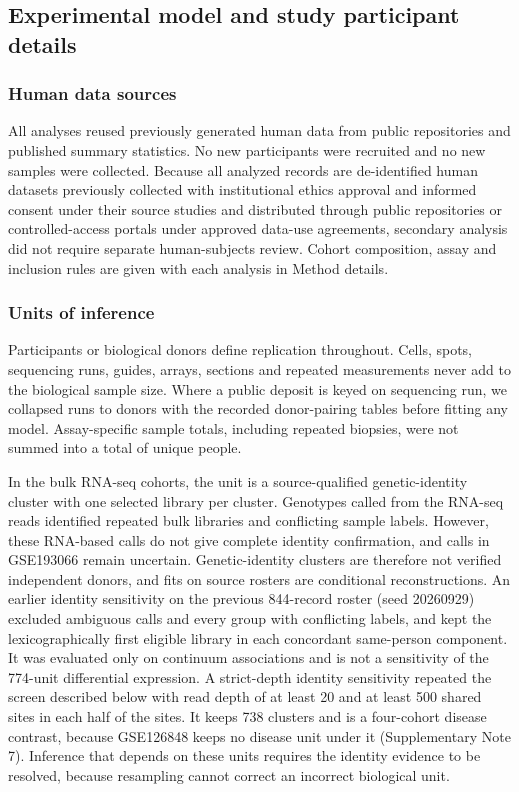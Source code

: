 \subsection{Experimental model and study participant details}\label{experimental-model-and-study-participant-details}

\subsubsection{Human data sources}\label{human-data-sources}

All analyses reused previously generated human data from public repositories and published summary statistics. No new participants were recruited and no new samples were collected. Because all analyzed records are de-identified human datasets previously collected with institutional ethics approval and informed consent under their source studies and distributed through public repositories or controlled-access portals under approved data-use agreements, secondary analysis did not require separate human-subjects review. Cohort composition, assay and inclusion rules are given with each analysis in Method details.

\subsubsection{Units of inference}\label{units-of-inference}

Participants or biological donors define replication throughout. Cells, spots, sequencing runs, guides, arrays, sections and repeated measurements never add to the biological sample size. Where a public deposit is keyed on sequencing run, we collapsed runs to donors with the recorded donor-pairing tables before fitting any model. Assay-specific sample totals, including repeated biopsies, were not summed into a total of unique people.

In the bulk RNA-seq cohorts, the unit is a source-qualified genetic-identity cluster with one selected library per cluster. Genotypes called from the RNA-seq reads identified repeated bulk libraries and conflicting sample labels. However, these RNA-based calls do not give complete identity confirmation, and calls in GSE193066 remain uncertain. Genetic-identity clusters are therefore not verified independent donors, and fits on source rosters are conditional reconstructions. An earlier identity sensitivity on the previous 844-record roster (seed 20260929) excluded ambiguous calls and every group with conflicting labels, and kept the lexicographically first eligible library in each concordant same-person component. It was evaluated only on continuum associations and is not a sensitivity of the 774-unit differential expression. A strict-depth identity sensitivity repeated the screen described below with read depth of at least 20 and at least 500 shared sites in each half of the sites. It keeps 738 clusters and is a four-cohort disease contrast, because GSE126848 keeps no disease unit under it (Supplementary Note 7). Inference that depends on these units requires the identity evidence to be resolved, because resampling cannot correct an incorrect biological unit.

